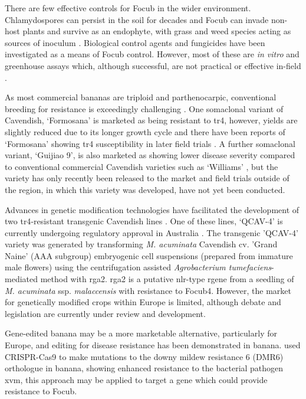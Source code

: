 There are few effective controls for \ac{Focub} in the wider environment. Chlamydospores can persist in the soil for decades and \ac{Focub} can invade non-host plants and survive as an endophyte, with grass and weed species acting as sources of inoculum \parencite{Pegg2019}. Biological control agents and fungicides have been investigated as a means of \ac{Focub} control. However, most of these are \textit{in vitro} and greenhouse assays which, although successful, are not practical or effective in-field \parencite{Dita2018}.  

As most commercial bananas are triploid and parthenocarpic, conventional breeding for resistance is exceedingly challenging \parencite{Dale2017}. One somaclonal variant of Cavendish, ‘Formosana’ is marketed as being resistant to \ac{tr4}, however, yields are slightly reduced due to its longer growth cycle and there have been reports of  ‘Formosana’ showing \ac{tr4} susceptibility in later field trials \parencite{Lee2011, Dale2017}. A further somaclonal variant, ‘Guijiao 9’, is also marketed as showing lower disease severity compared to conventional commercial Cavendish varieties such as ‘Williams’ \parencite{Sun2019}, but the variety has only recently been released to the market and field trials outside of the region, in which this variety was developed, have not yet been conducted.  

Advances in genetic modification technologies have facilitated the development of two \ac{tr4}-resistant transgenic Cavendish lines \parencite{Dale2017}. One of these lines, ‘QCAV-4’ is currently undergoing regulatory approval in Australia \parencite{Lu2023}. The transgenic 'QCAV-4' variety was generated by transforming \textit{M. acuminata }Cavendish cv. 'Grand Naine' (AAA subgroup) embryogenic cell suspensions (prepared from immature male flowers) using the centrifugation assisted \textit{Agrobacterium tumefaciens}-mediated method with \ac{rga2}. \ac{rga2} is a putative \ac{nlr}-type \ac{rgene} from a seedling of \textit{M. acuminata} ssp. \textit{malaccensis} with resistance to \ac{Focub4}. However, the market for genetically modified crops within Europe is limited, although debate and legislation are currently under review and development. 

Gene-edited banana may be a more marketable alternative, particularly for Europe, and editing for disease resistance has been demonstrated in banana. \textcite{Tripathi2021} used CRISPR-Cas9 to make mutations to the downy mildew resistance 6 (DMR6) orthologue in banana, showing enhanced resistance to the bacterial pathogen \ac{xvm}, this approach may be applied to target a gene which could provide resistance to \ac{Focub}.  

